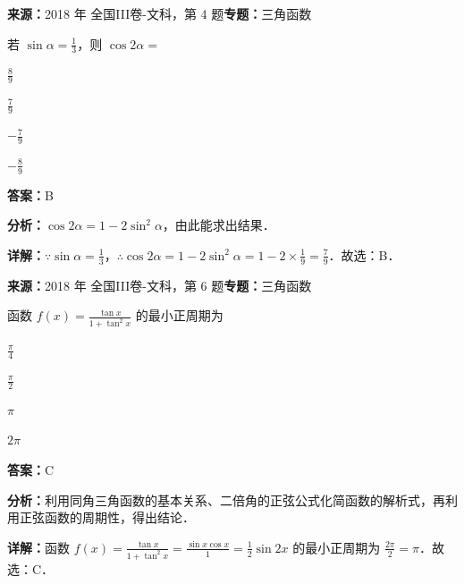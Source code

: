 \begin{question}[points=5]
\textbf{来源：}2018 年 全国III卷-文科，第 4 题\quad \textbf{专题：}三角函数\par
若 $\sin\alpha = \frac{1}{3}$，则 $\cos2\alpha =$
\begin{choices}
  \item $\frac{8}{9}$
  \item $\frac{7}{9}$
  \item $-\frac{7}{9}$
  \item $-\frac{8}{9}$
\end{choices}
\begin{solution}
\textbf{答案：}B

\textbf{分析：}$\cos2\alpha=1-2\sin^2\alpha$，由此能求出结果．

\textbf{详解：}$\because \sin\alpha = \frac{1}{3}$，$\therefore \cos2\alpha = 1-2\sin^2\alpha = 1-2\times \frac{1}{9} = \frac{7}{9}$．故选：B．
\end{solution}
\end{question}

\begin{question}[points=5]
\textbf{来源：}2018 年 全国III卷-文科，第 6 题\quad \textbf{专题：}三角函数\par
函数 $f(x) = \frac{\tan x}{1+\tan^2 x}$ 的最小正周期为
\begin{choices}
  \item $\frac{\pi}{4}$
  \item $\frac{\pi}{2}$
  \item $\pi$
  \item $2\pi$
\end{choices}
\begin{solution}
\textbf{答案：}C

\textbf{分析：}利用同角三角函数的基本关系、二倍角的正弦公式化简函数的解析式，再利用正弦函数的周期性，得出结论．

\textbf{详解：}函数 $f(x) = \frac{\tan x}{1+\tan^2 x} = \frac{\sin x \cos x}{1} = \frac{1}{2}\sin 2x$ 的最小正周期为 $\frac{2\pi}{2} = \pi$．故选：C．
\end{solution}
\end{question}

